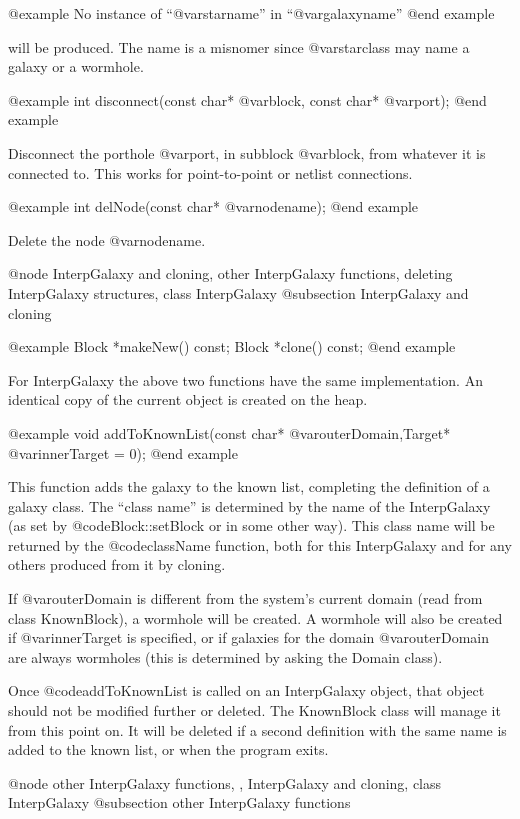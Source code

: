 @example
No instance of ``@var{starname}'' in ``@var{galaxyname}''
@end example

will be produced.  The name is a misnomer since @var{starclass} may
name a galaxy or a wormhole.

@example
int disconnect(const char* @var{block}, const char* @var{port});
@end example

Disconnect the porthole @var{port}, in subblock @var{block}, from
whatever it is connected to.  This works for point-to-point or netlist
connections.

@example
int delNode(const char* @var{nodename});
@end example

Delete the node @var{nodename}.

@node InterpGalaxy and cloning, other InterpGalaxy functions, deleting InterpGalaxy structures, class InterpGalaxy
@subsection InterpGalaxy and cloning

@example
Block *makeNew() const;
Block *clone() const;
@end example

For InterpGalaxy the above two functions have the same implementation.
An identical copy of the current object is created on the heap.

@example
void addToKnownList(const char* @var{outerDomain},Target* @var{innerTarget} = 0);
@end example

This function adds the galaxy to the known list, completing the
definition of a galaxy class.  The ``class name'' is determined by
the name of the InterpGalaxy (as set by @code{Block::setBlock} or
in some other way).  This class name will be returned by the
@code{className} function, both for this InterpGalaxy and for any
others produced from it by cloning.

If @var{outerDomain} is different from the system's current domain (read
from class KnownBlock), a wormhole will be created.  A wormhole will
also be created if @var{innerTarget} is specified, or if galaxies for
the domain @var{outerDomain} are always wormholes (this is determined by
asking the Domain class).

Once @code{addToKnownList} is called on an InterpGalaxy object,
that object should not be modified further or deleted.  The KnownBlock
class will manage it from this point on.  It will be deleted if a second
definition with the same name is added to the known list, or when the
program exits.


@node other InterpGalaxy functions,  , InterpGalaxy and cloning, class InterpGalaxy
@subsection other InterpGalaxy functions


